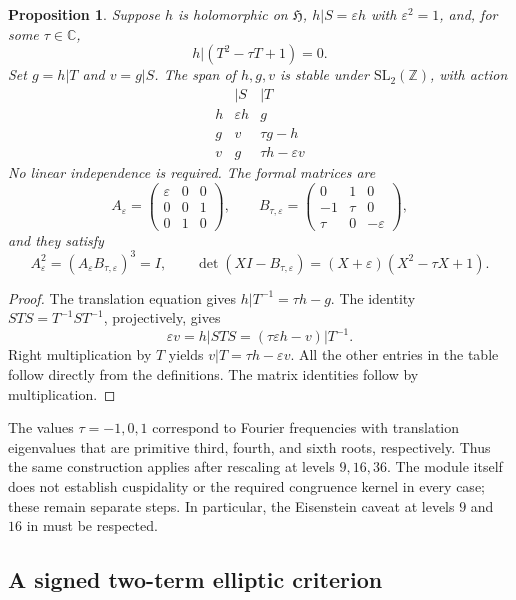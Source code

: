 \documentclass[11pt]{article}
\newtheorem{proposition}[theorem]{Proposition}
\theoremstyle{remark}
\newcommand{\HH}{\mathfrak H}
\newcommand{\SL}{\mathrm{SL}}
\newcommand{\eps}{\varepsilon}
\begin{document}
\begin{proposition}\label{prop:module}
Suppose $h$ is holomorphic on $\HH$, $h|S=\eps h$ with $\eps^2=1$,
and, for some $\tau\in\mathbb C$,
\[
 h|(T^2-\tau T+1)=0.
\]
Set $g=h|T$ and $v=g|S$. The span of $h,g,v$ is stable under
$\SL_2(\mathbb Z)$, with action
\begin{equation}\label{eq:module}
\begin{array}{c|cc}
 & |S & |T\\ \hline
 h & \eps h & g\\
 g & v & \tau g-h\\
 v & g & \tau h-\eps v
\end{array}
\end{equation}
No linear independence is required. The formal matrices are
\[
 A_\eps=\begin{pmatrix}\eps&0&0\\0&0&1\\0&1&0\end{pmatrix},
 \qquad
 B_{\tau,\eps}=\begin{pmatrix}0&1&0\\-1&\tau&0\\\tau&0&-\eps\end{pmatrix},
\]
and they satisfy
\[
 A_\eps^2=(A_\eps B_{\tau,\eps})^3=I,
 \qquad
 \det(XI-B_{\tau,\eps})=(X+\eps)(X^2-\tau X+1).
\]
\end{proposition}
\begin{proof}
The translation equation gives $h|T^{-1}=\tau h-g$.
The identity $STS=T^{-1}ST^{-1}$, projectively, gives
\[
 \eps v=h|STS=(\tau\eps h-v)|T^{-1}.
\]
Right multiplication by $T$ yields $v|T=\tau h-\eps v$.
All the other entries in the table follow directly from the definitions.
The matrix identities follow by multiplication.
\end{proof}

The values $\tau=-1,0,1$ correspond to Fourier frequencies with
translation eigenvalues that are primitive third, fourth, and sixth
roots, respectively. Thus the same construction applies after rescaling
at levels $9,16,36$. The module itself does not establish cuspidality
or the required congruence kernel in every case; these remain separate
steps. In particular, the Eisenstein caveat at levels $9$ and $16$ in
\cite[Section~5]{CF} must be respected.

\subsection{A signed two-term elliptic criterion}
\end{document}
